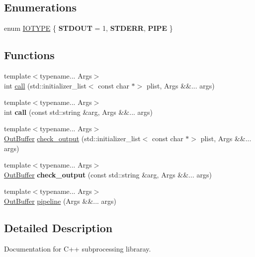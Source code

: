 \subsection*{Enumerations}
\begin{DoxyCompactItemize}
\item 
enum \hyperlink{namespacesubprocess_a8c21131feb99bed9ffa644851ff499ed}{I\+O\+T\+Y\+PE} \{ {\bfseries S\+T\+D\+O\+UT} = 1, 
{\bfseries S\+T\+D\+E\+RR}, 
{\bfseries P\+I\+PE}
 \}
\end{DoxyCompactItemize}
\subsection*{Functions}
\begin{DoxyCompactItemize}
\item 
{\footnotesize template$<$typename... Args$>$ }\\int \hyperlink{namespacesubprocess_a2568089d153628506e8ed02f94f06682}{call} (std\+::initializer\+\_\+list$<$ const char $\ast$$>$ plist, Args \&\&... args)
\item 
\mbox{\label{namespacesubprocess_abcf05011e85cc7d55ff83e988a4d5b9f}} 
{\footnotesize template$<$typename... Args$>$ }\\int {\bfseries call} (const std\+::string \&arg, Args \&\&... args)
\item 
{\footnotesize template$<$typename... Args$>$ }\\\hyperlink{classsubprocess_1_1Buffer}{Out\+Buffer} \hyperlink{namespacesubprocess_ab990a3b96997b604c9156843a687552a}{check\+\_\+output} (std\+::initializer\+\_\+list$<$ const char $\ast$$>$ plist, Args \&\&... args)
\item 
\mbox{\label{namespacesubprocess_a080806e0ed868dd75a615b0186201db3}} 
{\footnotesize template$<$typename... Args$>$ }\\\hyperlink{classsubprocess_1_1Buffer}{Out\+Buffer} {\bfseries check\+\_\+output} (const std\+::string \&arg, Args \&\&... args)
\item 
{\footnotesize template$<$typename... Args$>$ }\\\hyperlink{classsubprocess_1_1Buffer}{Out\+Buffer} \hyperlink{namespacesubprocess_a3c1cdb0eba1dfd9fd8ab48c334b8da59}{pipeline} (Args \&\&... args)
\end{DoxyCompactItemize}


\subsection{Detailed Description}
Documentation for C++ subprocessing libraray.

